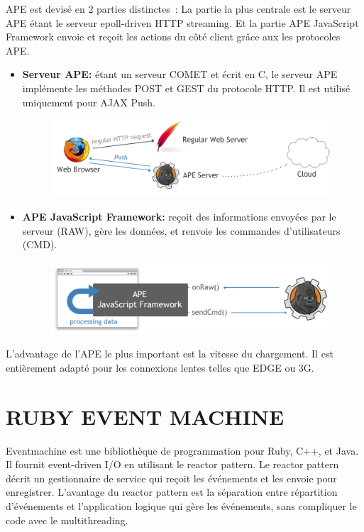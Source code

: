 \documentclass[a4paper,10pt]{report}
\begin{document}
APE est devisé en 2 parties distinctes : La partie la plus centrale est le serveur APE  étant le serveur epoll-driven HTTP streaming. Et la partie APE JavaScript Framework envoie et reçoit les actions du côté client grâce aux les protocoles APE.

\begin{itemize}

 \item \textbf{Serveur APE:} étant un serveur COMET et écrit en C, le serveur APE implémente les méthodes POST et GEST du protocole HTTP. Il est utilisé uniquement pour AJAX Push.
  \begin{figure}[!ht]
    \centering
    \includegraphics[scale=0.6, bb=0 0 497 136]{img/APEServeur.png} 
  \end{figure} 
 \item \textbf{APE JavaScript Framework:} reçoit des informations envoyées par le serveur (RAW), gère les données, et renvoie les commandes d’utilisateurs (CMD).
  \begin{figure}[!ht]
    \centering
    \includegraphics[scale=0.6, bb=0 0 500 127]{img/APEFramework.png} 
  \end{figure} 
\end{itemize}


L’advantage de l’APE le plus important est la vitesse du chargement. Il est entièrement adapté pour les connexions lentes telles que EDGE ou 3G.

  \section{RUBY EVENT MACHINE}
Eventmachine est une bibliothèque de programmation pour Ruby, C++, et Java. Il fournit event-driven I/O en utilisant le reactor pattern.  Le reactor pattern décrit un gestionnaire de service qui reçoit les événements et les envoie pour enregistrer. L’avantage du reactor pattern est la séparation entre répartition d’événements et l’application logique qui gère les événements, sans compliquer le code avec le multithreading.
\end{document}
